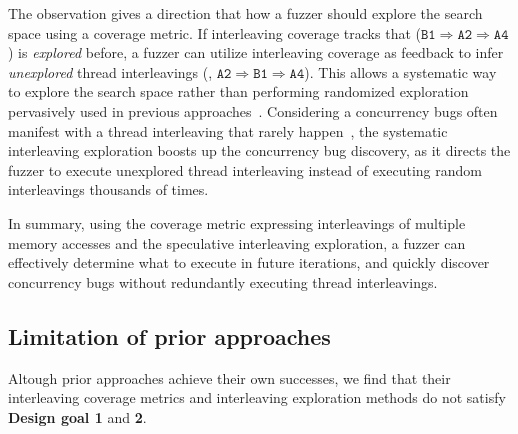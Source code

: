 %
The observation gives a direction that how a fuzzer should explore the
search space using a coverage metric.  If interleaving coverage tracks
that ($\texttt{B1} \Rightarrow \texttt{A2} \Rightarrow \texttt{A4}$)
is \textit{explored} before, a fuzzer can utilize interleaving
coverage as feedback to infer \textit{unexplored} thread interleavings
(\eg, $\texttt{A2} \Rightarrow \texttt{B1} \Rightarrow \texttt{A4}$).
%
This allows a systematic way to explore the search space rather than
performing randomized  exploration pervasively used
in previous approaches~\cite{ski, krace, pctalgorithm, muzz}.
%
Considering a concurrency bugs often manifest with a thread
interleaving that rarely happen~\cite{exprace}, the systematic
interleaving exploration boosts up the concurrency bug discovery, as
it directs the fuzzer to execute unexplored thread interleaving
instead of executing random interleavings thousands of times.


%
In summary, using the coverage metric expressing interleavings of
multiple memory accesses and the speculative interleaving exploration,
a fuzzer can effectively determine what to execute in future
iterations, and quickly discover concurrency bugs without redundantly
executing thread interleavings.


\subsection{Limitation of prior approaches}
\label{ss:existingapproaches}
%
%   

%
%
Altough prior approaches achieve their own successes, we find that
their interleaving coverage metrics and interleaving exploration
methods do not satisfy \textbf{Design goal 1} and \textbf{2}.


